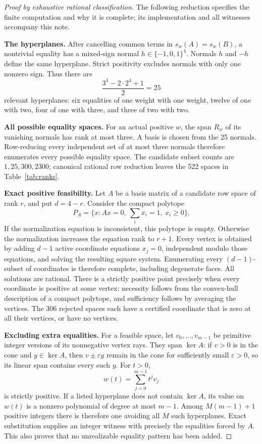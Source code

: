 \documentclass[11pt,a4paper]{article}
\begin{document}
\begin{proof}[Proof by exhaustive rational classification]
The following reduction specifies the finite computation and why
it is complete; its implementation and all witnesses accompany this note.

\textbf{The hyperplanes.}
After cancelling common terms in \(s_w(A)=s_w(B)\), a nontrivial equality
has a mixed-sign normal \(h\in\{-1,0,1\}^4\).
Normals \(h\) and \(-h\) define the same hyperplane.
Strict positivity excludes normals with only one nonzero sign.
Thus there are
\[
 \frac{3^4-2\cdot2^4+1}{2}=25
\]
relevant hyperplanes: six equalities of one weight with one weight,
twelve of one with two, four of one with three, and three of two with two.

\textbf{All possible equality spaces.}
For an actual positive \(w\), the span \(R_w\) of its vanishing
normals has rank at most three. A basis is chosen from the 25 normals.
Row-reducing every independent set of at most three normals therefore
enumerates every possible equality space. The candidate subset counts
are \(1,25,300,2300\); canonical rational row reduction leaves the
522 spaces in Table~\ref{tab:ranks}.

\textbf{Exact positive feasibility.}
Let \(A\) be a basis matrix of a candidate row space of rank \(r\),
and put \(d=4-r\). Consider the compact polytope
\[
 P_A=\{x:Ax=0,\ {\textstyle\sum_i x_i}=1,\ x_i\ge0\}.
\]
If the normalization equation is inconsistent, this polytope is empty.
Otherwise the normalization increases the equation rank to \(r+1\).
Every vertex is obtained by adding \(d-1\) active coordinate equations
\(x_j=0\), independent modulo those equations, and solving the resulting
square system.
Enumerating every \((d-1)\)-subset of coordinates is therefore complete,
including degenerate faces. All solutions are rational.
There is a strictly positive point precisely when every coordinate is
positive at some vertex: necessity follows from the convex-hull
description of a compact polytope, and sufficiency follows by averaging
the vertices.
The 306 rejected spaces each have a certified coordinate that is zero
at all their vertices, or have no vertices.

\textbf{Excluding extra equalities.}
For a feasible space, let \(v_0,\ldots,v_{m-1}\) be primitive integer
versions of its nonnegative vertex rays. They span \(\ker A\): if
\(v>0\) is in the cone and \(y\in\ker A\), then
\(v\pm\varepsilon y\) remain in the cone for sufficiently small
\(\varepsilon>0\), so its linear span contains every such \(y\).
For \(t>0\),
\[
 w(t)=\sum_{j=0}^{m-1}t^jv_j
\]
is strictly positive. If a listed hyperplane does not contain
\(\ker A\), its value on \(w(t)\) is a nonzero polynomial of degree at
most \(m-1\). Among \(M(m-1)+1\) positive integers there is therefore
one avoiding all \(M\) such hyperplanes.
Exact substitution supplies an integer witness with precisely the
equalities forced by \(A\).
This also proves that no unrealizable equality pattern has been added.


\end{proof}
\end{document}
